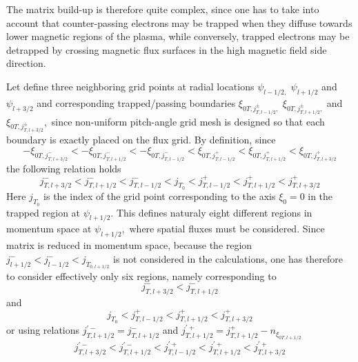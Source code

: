 The matrix build-up is therefore quite complex, since one has to take into
account that counter-passing electrons may be trapped when they diffuse
towards lower magnetic regions of the plasma, while conversely, trapped
electrons may be detrapped by crossing magnetic flux surfaces in the high
magnetic field side direction.

Let define three neighboring grid points at radial locations $\psi _{l-1/2,}$
$\psi _{l+1/2}$ and $\psi _{l+3/2}$ and corresponding trapped/passing
boundaries $\xi _{0T,j_{T,l-1/2}^{\pm },}$ $\xi _{0T,j_{T,l+1/2}^{\pm },}$
and $\xi _{0T,j_{T,l+3/2}^{\pm }},$ since non-uniform pitch-angle grid mesh
is designed so that each boundary is exactly placed on the flux grid. By
definition, since
\begin{equation}
-\xi _{0T,j_{T,l+3/2}^{-}}<-\xi _{0T,j_{T,l+1/2}^{-}}<-\xi
_{0T,j_{T,l-1/2}^{-}}<\xi _{0T,j_{T,l-1/2}^{+}}<\xi
_{0T,j_{T,l+1/2}^{+}}<\xi _{0T,j_{T,l+3/2}^{+}}
\end{equation}
the following relation holds
\begin{equation}
j_{T,l+3/2}^{-}<j_{T,l+1/2}^{-}<j_{T,l-1/2}^{-}<j_{T_{0}}<j_{T,l-1/2}^{+}<j_{T,l+1/2}^{+}<j_{T,l+3/2}^{+}
\end{equation}
Here $j_{T_{0}}$ is the index of the grid point corresponding to the axis $%
\xi _{0}=0$ in the trapped region at $\psi _{l+1/2}.$ This defines naturaly
eight different regions in momentum space at $\psi _{l+1/2},$ where spatial
fluxes must be considered. Since matrix is reduced in momentum space,
because the region $j_{l+1/2}^{-}<j_{l-1/2}^{-}<j_{T_{0,l+1/2}}$ is not
considered in the calculations, one has therefore to consider effectively
only six regions, namely corresponding to
\begin{equation}
j_{T,l+3/2}^{-}<j_{T,l+1/2}^{-}
\end{equation}
and
\begin{equation}
j_{T_{0}}<j_{T,l-1/2}^{+}<j_{T,l+1/2}^{+}<j_{T,l+3/2}^{+}
\end{equation}
or using relations $j_{T,l+1/2}^{\prime -}=j_{T,l+1/2}^{-}$ and $%
j_{T,l+1/2}^{\prime +}=j_{T,l+1/2}^{+}-n_{\xi _{0T,l+1/2}}$
\begin{equation}
j_{T,l+3/2}^{\prime -}<j_{T,l+1/2}^{\prime -}<j_{T,l-1/2}^{\prime
+}<j_{T,l+1/2}^{\prime +}<j_{T,l+3/2}^{\prime +}
\end{equation}


